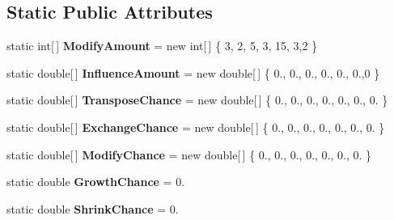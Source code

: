 \subsection*{Static Public Attributes}
\begin{DoxyCompactItemize}
\item 
\hypertarget{class_music_population_1_1_member3_a0f2432f6350e143c9481a396aa772488}{static int\mbox{[}$\,$\mbox{]} {\bfseries Modify\+Amount} = new int\mbox{[}$\,$\mbox{]} \{ 3, 2, 5, 3, 15, 3,2 \}}\label{class_music_population_1_1_member3_a0f2432f6350e143c9481a396aa772488}

\item 
\hypertarget{class_music_population_1_1_member3_a1c5540a52ddaf4bf79860228ec2d0c6d}{static double\mbox{[}$\,$\mbox{]} {\bfseries Influence\+Amount} = new double\mbox{[}$\,$\mbox{]} \{ 0., 0., 0., 0., 0., 0.,0 \}}\label{class_music_population_1_1_member3_a1c5540a52ddaf4bf79860228ec2d0c6d}

\item 
\hypertarget{class_music_population_1_1_member3_aee4d992f98eae4b1041d23d3e16dbf25}{static double\mbox{[}$\,$\mbox{]} {\bfseries Transpose\+Chance} = new double\mbox{[}$\,$\mbox{]} \{ 0., 0., 0., 0., 0., 0., 0. \}}\label{class_music_population_1_1_member3_aee4d992f98eae4b1041d23d3e16dbf25}

\item 
\hypertarget{class_music_population_1_1_member3_ad1e54d4ec4deb35b63ea19d99781a933}{static double\mbox{[}$\,$\mbox{]} {\bfseries Exchange\+Chance} = new double\mbox{[}$\,$\mbox{]} \{ 0., 0., 0., 0., 0., 0., 0. \}}\label{class_music_population_1_1_member3_ad1e54d4ec4deb35b63ea19d99781a933}

\item 
\hypertarget{class_music_population_1_1_member3_aeef13e2b79c4d030a44f9668beaa4e94}{static double\mbox{[}$\,$\mbox{]} {\bfseries Modify\+Chance} = new double\mbox{[}$\,$\mbox{]} \{ 0., 0., 0., 0., 0., 0., 0. \}}\label{class_music_population_1_1_member3_aeef13e2b79c4d030a44f9668beaa4e94}

\item 
\hypertarget{class_music_population_1_1_member3_aeab9c6bd36d28028d98abcd9164907b8}{static double {\bfseries Growth\+Chance} = 0.}\label{class_music_population_1_1_member3_aeab9c6bd36d28028d98abcd9164907b8}

\item 
\hypertarget{class_music_population_1_1_member3_a0e5ce99e51dfbbb45aa8772bfc213a13}{static double {\bfseries Shrink\+Chance} = 0.}\label{class_music_population_1_1_member3_a0e5ce99e51dfbbb45aa8772bfc213a13}


\end{DoxyCompactItemize}
